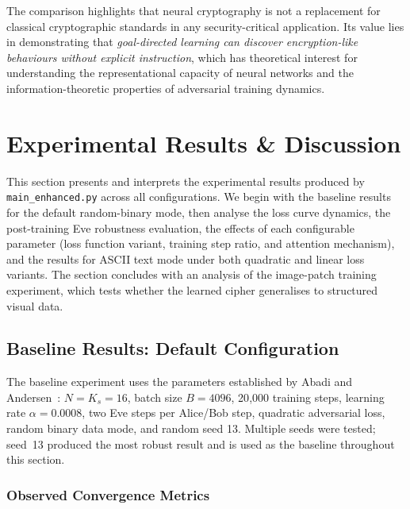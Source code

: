 \documentclass[12pt, a4paper]{article}
\newcommand{\code}[1]{\texttt{\color{CodeRed}#1}}
\begin{document}
\noindent The comparison highlights that neural cryptography is not
a replacement for classical cryptographic standards in any security-critical
application. Its value lies in demonstrating that \emph{goal-directed
learning can discover encryption-like behaviours without explicit
instruction}, which has theoretical interest for understanding the
representational capacity of neural networks and the information-theoretic
properties of adversarial training dynamics.


\newpage
\section{Experimental Results \& Discussion}
\label{sec:results}

This section presents and interprets the experimental results produced
by \code{main\_enhanced.py} across all configurations. We begin with
the baseline results for the default random-binary mode, then analyse
the loss curve dynamics, the post-training Eve robustness evaluation,
the effects of each configurable parameter (loss function variant,
training step ratio, and attention mechanism), and the results for
ASCII text mode under both quadratic and linear loss variants.
The section concludes with an analysis of the image-patch training
experiment, which tests whether the learned cipher generalises to
structured visual data.

\subsection{Baseline Results: Default Configuration}
\label{subsec:baseline_results}

The baseline experiment uses the parameters established by Abadi and
Andersen~\cite{abadi2016learning}: $N = K_s = 16$, batch size $B = 4096$,
20{,}000 training steps, learning rate $\alpha = 0.0008$, two Eve steps
per Alice/Bob step, quadratic adversarial loss, random binary data mode,
and random seed 13. Multiple seeds were tested; seed~13 produced the most
robust result and is used as the baseline throughout this section.

\subsubsection*{Observed Convergence Metrics}
\end{document}
